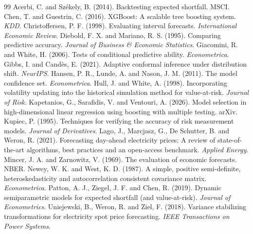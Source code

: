 \documentclass[11pt,a4paper]{article}
\begin{document}
\begin{thebibliography}{99}\small
{} Acerbi, C. and Sz\'ekely, B. (2014). Backtesting expected shortfall. MSCI.
 Chen, T. and Guestrin, C. (2016). XGBoost: A scalable tree boosting system. \textit{KDD}.
 Christoffersen, P. F. (1998). Evaluating interval forecasts. \textit{International Economic Review}.
 Diebold, F. X. and Mariano, R. S. (1995). Comparing predictive accuracy. \textit{Journal of Business \& Economic Statistics}.
 Giacomini, R. and White, H. (2006). Tests of conditional predictive ability. \textit{Econometrica}.
 Gibbs, I. and Cand\`es, E. (2021). Adaptive conformal inference under distribution shift. \textit{NeurIPS}.
 Hansen, P. R., Lunde, A. and Nason, J. M. (2011). The model confidence set. \textit{Econometrica}.
 Hull, J. and White, A. (1998). Incorporating volatility updating into the historical simulation method for value-at-risk. \textit{Journal of Risk}.
 Kapetanios, G., Sarafidis, V. and Ventouri, A. (2026). Model selection in high-dimensional linear regression using boosting with multiple testing. arXiv.
 Kupiec, P. (1995). Techniques for verifying the accuracy of risk measurement models. \textit{Journal of Derivatives}.
 Lago, J., Marcjasz, G., De Schutter, B. and Weron, R. (2021). Forecasting day-ahead electricity prices: A review of state-of-the-art algorithms, best practices and an open-access benchmark. \textit{Applied Energy}.
 Mincer, J. A. and Zarnowitz, V. (1969). The evaluation of economic forecasts. NBER.
 Newey, W. K. and West, K. D. (1987). A simple, positive semi-definite, heteroskedasticity and autocorrelation consistent covariance matrix. \textit{Econometrica}.
 Patton, A. J., Ziegel, J. F. and Chen, R. (2019). Dynamic semiparametric models for expected shortfall (and value-at-risk). \textit{Journal of Econometrics}.
 Uniejewski, B., Weron, R. and Ziel, F. (2018). Variance stabilizing transformations for electricity spot price forecasting. \textit{IEEE Transactions on Power Systems}.
\end{thebibliography}
\end{document}
